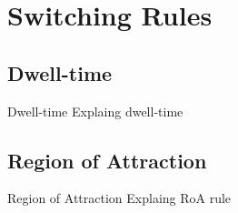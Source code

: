 
\section{Switching Rules}%
\label{sec:switching-rules}

\subsection{Dwell-time}%
\label{subsec:dwell-time}

\begin{slide}{Dwell-time}
  Explaing dwell-time
\end{slide}

\subsection{Region of Attraction}%
\label{subsec:roa-rule}

\begin{slide}{Region of Attraction}
  Explaing RoA rule
\end{slide}
